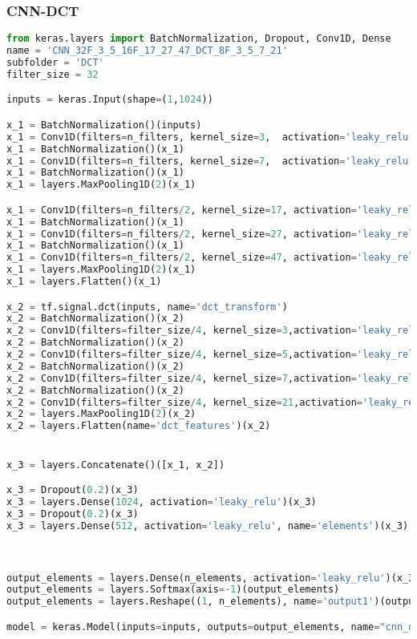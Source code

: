 \hypertarget{cnn-dct}{%
\subsubsection*{CNN-DCT}\label{cnn-dct}}

\begin{lstlisting}[language=Python]
from keras.layers import BatchNormalization, Dropout, Conv1D, Dense
name = 'CNN_32F_3_5_16F_17_27_47_DCT_8F_3_5_7_21'
subfolder = 'DCT'
filter_size = 32

inputs = keras.Input(shape=(1,1024))

x_1 = BatchNormalization()(inputs)
x_1 = Conv1D(filters=n_filters, kernel_size=3,  activation='leaky_relu', data_format='channels_first')(x_1)
x_1 = BatchNormalization()(x_1)
x_1 = Conv1D(filters=n_filters, kernel_size=7,  activation='leaky_relu', data_format='channels_first')(x_1)
x_1 = BatchNormalization()(x_1)
x_1 = layers.MaxPooling1D(2)(x_1)

x_1 = Conv1D(filters=n_filters/2, kernel_size=17, activation='leaky_relu', data_format='channels_first')(x_1)
x_1 = BatchNormalization()(x_1)
x_1 = Conv1D(filters=n_filters/2, kernel_size=27, activation='leaky_relu', data_format='channels_first')(x_1)
x_1 = BatchNormalization()(x_1)
x_1 = Conv1D(filters=n_filters/2, kernel_size=47, activation='leaky_relu', data_format='channels_first')(x_1)
x_1 = layers.MaxPooling1D(2)(x_1)
x_1 = layers.Flatten()(x_1)

x_2 = tf.signal.dct(inputs, name='dct_transform')
x_2 = BatchNormalization()(x_2)
x_2 = Conv1D(filters=filter_size/4, kernel_size=3,activation='leaky_relu', data_format='channels_first')(x_2)
x_2 = BatchNormalization()(x_2)
x_2 = Conv1D(filters=filter_size/4, kernel_size=5,activation='leaky_relu', data_format='channels_first')(x_2)
x_2 = BatchNormalization()(x_2)
x_2 = Conv1D(filters=filter_size/4, kernel_size=7,activation='leaky_relu', data_format='channels_first')(x_2)
x_2 = BatchNormalization()(x_2)
x_2 = Conv1D(filters=filter_size/4, kernel_size=21,activation='leaky_relu',data_format='channels_first')(x_2)
x_2 = layers.MaxPooling1D(2)(x_2)
x_2 = layers.Flatten(name='dct_features')(x_2)


x_3 = layers.Concatenate()([x_1, x_2])

x_3 = Dropout(0.2)(x_3)
x_3 = layers.Dense(1024, activation='leaky_relu')(x_3)
x_3 = Dropout(0.2)(x_3)
x_3 = layers.Dense(512, activation='leaky_relu', name='elements')(x_3)



output_elements = layers.Dense(n_elements, activation='leaky_relu')(x_3)
output_elements = layers.Softmax(axis=-1)(output_elements)
output_elements = layers.Reshape((1, n_elements), name='output1')(output_elements)

model = keras.Model(inputs=inputs, outputs=output_elements, name="cnn_dct")
\end{lstlisting}

